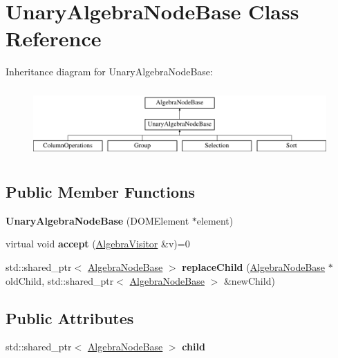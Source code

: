 \hypertarget{class_unary_algebra_node_base}{\section{Unary\+Algebra\+Node\+Base Class Reference}
\label{class_unary_algebra_node_base}
}
Inheritance diagram for Unary\+Algebra\+Node\+Base\+:\begin{figure}[H]
\begin{center}
\leavevmode
\includegraphics[height=2.675159cm]{class_unary_algebra_node_base}
\end{center}
\end{figure}
\subsection*{Public Member Functions}
\begin{DoxyCompactItemize}
\item 
\hypertarget{class_unary_algebra_node_base_a557e3eb8be4cc10c3febe5c3d8918c86}{{\bfseries Unary\+Algebra\+Node\+Base} (D\+O\+M\+Element $\ast$element)}\label{class_unary_algebra_node_base_a557e3eb8be4cc10c3febe5c3d8918c86}

\item 
\hypertarget{class_unary_algebra_node_base_a33355111a226cb460c9a13efaf922e32}{virtual void {\bfseries accept} (\hyperlink{class_algebra_visitor}{Algebra\+Visitor} \&v)=0}\label{class_unary_algebra_node_base_a33355111a226cb460c9a13efaf922e32}

\item 
\hypertarget{class_unary_algebra_node_base_a26aeeaeb45f97051d618cfcceccd5949}{std\+::shared\+\_\+ptr$<$ \hyperlink{class_algebra_node_base}{Algebra\+Node\+Base} $>$ {\bfseries replace\+Child} (\hyperlink{class_algebra_node_base}{Algebra\+Node\+Base} $\ast$old\+Child, std\+::shared\+\_\+ptr$<$ \hyperlink{class_algebra_node_base}{Algebra\+Node\+Base} $>$ \&new\+Child)}\label{class_unary_algebra_node_base_a26aeeaeb45f97051d618cfcceccd5949}

\end{DoxyCompactItemize}
\subsection*{Public Attributes}
\begin{DoxyCompactItemize}
\item 
\hypertarget{class_unary_algebra_node_base_a411f3922d4ab886c364e502f2370752e}{std\+::shared\+\_\+ptr$<$ \hyperlink{class_algebra_node_base}{Algebra\+Node\+Base} $>$ {\bfseries child}}\label{class_unary_algebra_node_base_a411f3922d4ab886c364e502f2370752e}

\end{DoxyCompactItemize}


